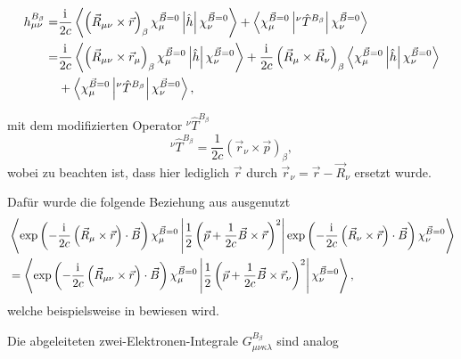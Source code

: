   	 \begin{equation}\label{eq:hmunub}
  	 \begin{aligned}
  	 h_{\mu\nu}^{B_\beta}=&\frac{\mathrm{i}\mkern1mu}{2c}\left\langle\left(\vec{R}_{\mu\nu}\times\vec{r}\right)_\beta\chi_\mu^{\vec{B}=0}\left\vert\hat{h}\right\vert\chi_\nu^{\vec{B}=0}\right\rangle+\left\langle\chi_\mu^{\vec{B}=0}\left\vert^\nu\hat{T}^{B_\beta}\right\vert\chi_\nu^{\vec{B}=0}\right\rangle\\
  	 =&\frac{\mathrm{i}\mkern1mu}{2c}\left\langle\left(\vec{R}_{\mu\nu}\times\vec{r}_\mu\right)_\beta\chi_\mu^{\vec{B}=0}\left\vert\hat{h}\right\vert\chi_\nu^{\vec{B}=0}\right\rangle
  	 +\frac{\mathrm{i}\mkern1mu}{2c}\left(\vec{R}_{\mu}\times\vec{R}_\nu\right)_\beta\left\langle\chi_\mu^{\vec{B}=0}\left\vert\hat{h}\right\vert\chi_\nu^{\vec{B}=0}\right\rangle\\
  	 &+\left\langle\chi_\mu^{\vec{B}=0}\left\vert^\nu\hat{T}^{B_\beta}\right\vert\chi_\nu^{\vec{B}=0}\right\rangle,
     \end{aligned}
  	 \end{equation}
  	
  	 mit dem modifizierten Operator $^\nu\hat{T}^{B_\beta}$ 
   	 \begin{equation}
  	 ^\nu\hat{T}^{B_\beta}=\frac{1}{2c}\left(\vec{r}_\nu\times \vec{p}\right)_\beta,
  	 \end{equation}
  	 wobei zu beachten ist, dass hier lediglich $\vec{r}$ durch $\vec{r}_\nu=\vec{r}-\vec{R}_\nu$ ersetzt wurde.
  	   	 
  	 Dafür wurde die folgende Beziehung aus \supercite{ditchfield1974self} ausgenutzt 
  	 \begin{equation}
  	 \begin{aligned}
  	 &\left\langle\exp\left(-\frac{\mathrm{i}\mkern1mu}{2c}\left(\vec{R}_\mu\times\vec{r}\right)\cdot\vec{B}\right)\chi_\mu^{\vec{B}=0}\left\vert\frac{1}{2}\left(\vec{p}+\frac{1}{2c}\vec{B}\times\vec{r}\right)^2\right\vert\exp\left(-\frac{\mathrm{i}\mkern1mu}{2c}\left(\vec{R}_\nu\times\vec{r}\right)\cdot\vec{B}\right)\chi_\nu^{\vec{B}=0}\right\rangle\\
  	 &=\left\langle\exp\left(-\frac{\mathrm{i}\mkern1mu}{2c}\left(\vec{R}_{\mu\nu}\times\vec{r}\right)\cdot\vec{B}\right)\chi_\mu^{\vec{B}=0}\left\vert\frac{1}{2}\left(\vec{p}+\frac{1}{2c}\vec{B}\times\vec{r}_\nu\right)^2\right\vert\chi_\nu^{\vec{B}=0}\right\rangle,
  	 \end{aligned}
  	 \end{equation}
  	 welche beispielsweise in \supercite{baron1991} bewiesen wird. 
  	 
  	 
  	 Die abgeleiteten zwei-Elektronen-Integrale $G_{\mu\nu\kappa\lambda}^{B_\beta}$ sind analog
  	 
